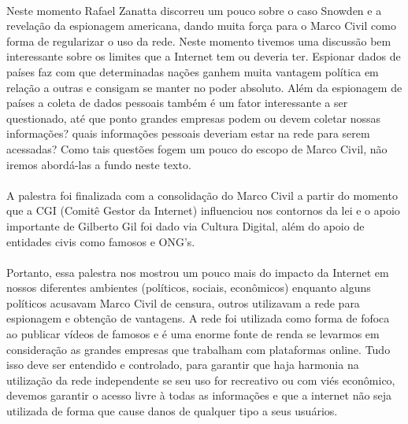 \documentclass[12pt]{article}
\begin{document}
		\paragraph{}
			Neste momento  Rafael Zanatta discorreu um pouco sobre o caso
			Snowden e a revelação da espionagem americana, dando muita força
			para o Marco Civil como forma de regularizar o uso da rede. Neste
			momento tivemos uma discussão bem interessante sobre os limites
			que a Internet tem ou deveria ter. Espionar dados de países faz com que
			determinadas nações ganhem muita vantagem política em relação a outras
			e consigam se	 manter no poder absoluto. Além da espionagem de países
			a coleta de dados pessoais também é um fator interessante a ser 
			questionado, até que ponto grandes empresas podem ou devem coletar
			nossas informações? quais informações pessoais deveriam estar na rede
			para serem acessadas? Como tais questões fogem um pouco do escopo
			de Marco Civil, não iremos abordá-las a fundo neste texto.
		\paragraph{}
			A palestra foi finalizada com a consolidação do Marco Civil a partir do
			momento que a CGI (Comitê Gestor da Internet) influenciou nos contornos
			da lei e o apoio importante de Gilberto Gil foi dado via Cultura Digital, 
			além do apoio de entidades civis como famosos e ONG's.	
		\paragraph{}
			Portanto, essa palestra nos mostrou um pouco mais do impacto da Internet
			em nossos diferentes ambientes (políticos, sociais, econômicos) enquanto
			alguns políticos acusavam Marco Civil de censura, outros utilizavam a rede
			para espionagem e obtenção de vantagens. A rede foi utilizada como forma
			de fofoca ao publicar vídeos de famosos	 e é uma enorme fonte de renda
			se levarmos em consideração as grandes empresas que trabalham com 
			plataformas online. Tudo isso deve ser entendido e controlado, para garantir
			que haja harmonia na utilização da rede independente se seu uso for
			recreativo ou com viés econômico, devemos garantir o acesso livre à todas
			as informações e que a internet não seja utilizada de forma que cause
			danos de qualquer tipo a seus usuários. 	
\end{document}
